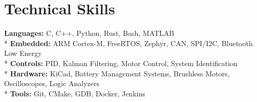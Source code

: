 
\section{Technical Skills}
    \begin{itemize}[leftmargin=0.15in, label={}]
    \small{\item{
        \textbf{Languages:}{
            C, C++, Python, Rust, Bash, MATLAB
        } \\*
        \textbf{Embedded:}{
            ARM Cortex-M, FreeRTOS, Zephyr, CAN, SPI/I2C, Bluetooth Low Energy
        } \\*
        \textbf{Controls:}{
            PID, Kalman Filtering, Motor Control, System Identification
        } \\*
        \textbf{Hardware:}{
            KiCad, Battery Management Systems, Brushless Motors, Oscilloscopes, Logic Analyzers
        } \\*
        \textbf{Tools:}{
            Git, CMake, GDB, Docker, Jenkins
        }
    }}
    \end{itemize}
